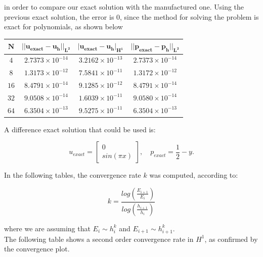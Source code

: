 \documentclass[11pt,a4paper,titlepage]{report}
\begin{document}
in order to compare our exact solution with the manufactured one.
Using the previous exact solution, the error is 0, since the method for solving the problem is exact for polynomials, as shown below


\begin{center}
\begin{tabular}{| c | c | c | c |}
\hline
$\mathbf{N}$ & $\mathbf{|| u_{exact} - u_h ||_{L^2}}$ & $ \mathbf{ | u_{exact} - u_h |_{H^1}}$ & $  \mathbf{ || p_{exact} - p_h ||_{L^2}}$ \\
\hline
$ 4 $ & $2.7373 \times 10^{-14}$ & $3.2162 \times 10^{-13}$ &  $ 2.7373 \times 10^{-14}$ \\
\hline
$ 8$ & $1.3173  \times 10^{-12}$ & $7.5841 \times 10^{-11}$ &  $ 1.3172  \times 10^{-12}$ \\
\hline
$ 16 $ & $ 8.4791 \times 10^{-14}$ & $9.1285 \times 10^{-12}$ & $ 8.4791 \times 10^{-14}$ \\
\hline
$ 32$ & $9.0508 \times 10^{-14}$ & $1.6039 \times 10^{-11}$ &  $ 9.0580 \times 10^{-14}$ \\
\hline
$ 64$ & $6.3504 \times 10^{-13}$ & $9.5275 \times 10^{-11}$ &  $ 6.3504 \times 10^{-13}$ \\
\hline
\end{tabular}
\end{center}

\vspace{1cm}

A difference exact solution that could be used is:

\[
u_{exact} = \left[ \begin{array}{c} 0 \\ sin(\pi x) \end{array} \right], \quad 
p_{exact} = \frac{1}{2}-y.
\]

In the following tables, the convergence rate $k$ was computed, according to:

\[
k = \frac{log(\frac{E_{i+1}}{E_i})}{log(\frac{h_{i+1}}{h_i})}
\]

where we are assuming that $E_i \sim h^k_i$ and $E_{i+1} \sim h^k_{i+1}$. \\
The following table shows a second order convergence rate in $H^1$, as confirmed by the convergence plot.
\end{document}
